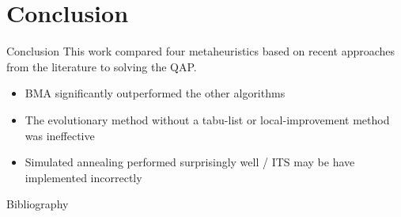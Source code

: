 \section{Conclusion} {
    \begin{frame}{Conclusion}
        This work compared four metaheuristics based on recent approaches from the literature to solving the QAP.

        \begin{itemize}
            \item BMA significantly outperformed the other algorithms
            \item The evolutionary method without a tabu-list or local-improvement method was ineffective
            \item Simulated annealing performed surprisingly well / ITS may be have implemented incorrectly
        \end{itemize}

    \end{frame}

    \begin{frame}{Bibliography}
      \vspace{-2em}
      
      \fontsize{0.5em}{0.5em}\selectfont
      
    \end{frame}

}





